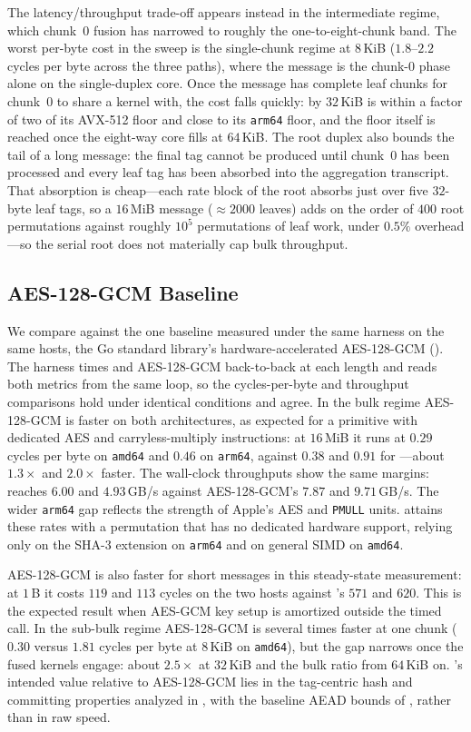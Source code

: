 The latency/throughput trade-off appears instead in the intermediate regime,
which chunk~$0$ fusion has narrowed to roughly the one-to-eight-chunk band. The
worst per-byte cost in the sweep is the single-chunk regime at $8$\,KiB
($1.8$--$2.2$ cycles per byte across the three paths), where the message is the
chunk-$0$ phase alone on the single-duplex core. Once the message has complete
leaf chunks for chunk~$0$ to share a kernel with, the cost falls quickly: by
$32$\,KiB \TW{} is within a factor of two of its AVX-512 floor and close to its
\texttt{arm64} floor, and the floor itself is reached once the eight-way core
fills at $64$\,KiB. The root duplex also bounds the tail of a long
message: the final tag cannot be produced until chunk~$0$ has been processed and
every leaf tag has been absorbed into the aggregation transcript. That absorption
is cheap---each rate block of the root absorbs just over five $32$-byte leaf tags, so a
$16$\,MiB message ($\approx 2000$ leaves) adds on the order of $400$ root
permutations against roughly $10^5$ permutations of leaf work, under $0.5\%$
overhead---so the serial root does not materially cap bulk throughput.

\subsection{AES-128-GCM Baseline}
\label{sec:compare-perf}

We compare against the one baseline measured under the same harness on the same
hosts, the Go standard library's hardware-accelerated AES-128-GCM
(). The harness times \TW{} and AES-128-GCM
back-to-back at each length and reads both metrics from the same loop, so the
cycles-per-byte and throughput comparisons hold under identical conditions and
agree. In the bulk regime AES-128-GCM is faster on both architectures, as
expected for a primitive with dedicated AES and carryless-multiply instructions:
at $16$\,MiB it runs at $0.29$ cycles per byte on \texttt{amd64} and $0.46$ on
\texttt{arm64}, against $0.38$ and $0.91$ for \TW{}---about $1.3\times$ and
$2.0\times$ faster. The wall-clock throughputs show the same margins: \TW{}
reaches $6.00$ and $4.93$\,GB/s against AES-128-GCM's $7.87$ and
$9.71$\,GB/s. The wider \texttt{arm64} gap reflects the strength of Apple's AES
and \texttt{PMULL} units. \TW{} attains these rates with a permutation that has
no dedicated hardware support, relying only on the SHA-3 extension on
\texttt{arm64} and on general SIMD on \texttt{amd64}.

AES-128-GCM is also faster for short messages in this steady-state measurement:
at $1$\,B it costs $119$ and $113$ cycles on the two hosts against \TW{}'s
$571$ and $620$. This is the expected result when AES-GCM key setup is
amortized outside the timed call. In the sub-bulk regime AES-128-GCM is several
times faster at one chunk ($0.30$ versus $1.81$ cycles per byte at $8$\,KiB on
\texttt{amd64}), but the gap narrows once the fused kernels engage: about
$2.5\times$ at $32$\,KiB and the bulk ratio from $64$\,KiB on. \TW{}'s intended
value relative to AES-128-GCM lies in the tag-centric hash and committing
properties analyzed in , with the baseline
AEAD bounds of , rather than in raw speed.
